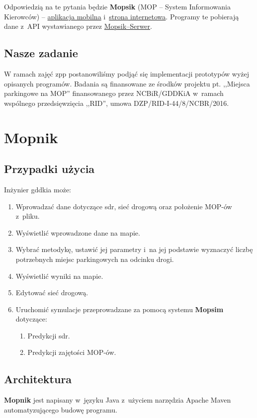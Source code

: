 Odpowiedzią na te pytania będzie \textbf{Mopsik} (MOP -- System Informowania Kierowców) -- \hyperref[mopsik_mobile]{aplikacja mobilna} i~\hyperref[mopsik_web]{strona internetowa}. Programy te pobierają dane z~API wystawianego przez \hyperref[mopsik_api]{Mopsik--Serwer}.


\section{Nasze zadanie}
W ramach zajęć \acrshort{zpp} postanowiliśmy podjąć się implementacji prototypów wyżej opisanych programów.
Badania są finansowane ze środków projektu pt. ,,Miejsca parkingowe na MOP'' finansowanego przez NCBiR/GDDKiA w~ramach wspólnego przedsięwzięcia ,,RID'', umowa DZP/RID-I-44/8/NCBR/2016.
\chapter{Mopnik}\label{r:Mopnik}
\label{r:mopnik}
\section{Przypadki użycia}
Inżynier \acrshort{gddkia} może:
\begin{enumerate}
  \item Wprowadzać dane dotyczące \acrshort{sdr}, sieć drogową oraz położenie MOP-ów z~pliku.
  \item Wyświetlić wprowadzone dane na mapie.
  \item Wybrać metodykę, ustawić jej parametry i~na jej podstawie wyznaczyć
    liczbę potrzebnych miejsc parkingowych na odcinku drogi.
  \item Wyświetlić wyniki na mapie.
  \item Edytować sieć drogową. 
  \item Uruchomić symulacje przeprowadzane za pomocą systemu
    \textbf{Mopsim} dotyczące:
    \begin{enumerate}
      \item Predykcji \acrshort{sdr}.
      \item Predykcji zajętości MOP-ów.
    \end{enumerate}
\end{enumerate}

\section{Architektura}
\textbf{Mopnik} jest napisany w~języku Java z~użyciem narzędzia Apache
Maven automatyzującego budowę programu.
